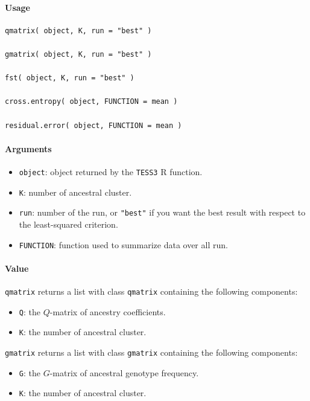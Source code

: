 \documentclass[10pt,a4paper]{article}
\begin{document}
\begin{itemize}
\paragraph{Usage}
\begin{Verbatim}
qmatrix( object, K, run = "best" )
 
gmatrix( object, K, run = "best" )
  
fst( object, K, run = "best" )
  
cross.entropy( object, FUNCTION = mean ) 

residual.error( object, FUNCTION = mean )

\end{Verbatim}
\paragraph{Arguments}
\begin{itemize}
\item \verb|object|: object returned by the \verb|TESS3| R function.
\item \verb|K|: number of ancestral cluster.
\item \verb|run|: number of the run, or \verb|"best"| if you want the best result with respect to the least-squared criterion.
\item \verb|FUNCTION|: function used to summarize data over all run.

\end{itemize}

\paragraph{Value}
\verb|qmatrix| returns a list with class \verb|qmatrix| containing the following components: 

\begin{itemize}
\item \verb|Q|: the $Q$-matrix of ancestry coefficients.
\item \verb|K|: the number of ancestral cluster.
\end{itemize}

\verb|gmatrix| returns a list with class \verb|gmatrix| containing the following components: 

\begin{itemize}
\item \verb|G|: the $G$-matrix of ancestral genotype frequency.
\item \verb|K|: the number of ancestral cluster.
\end{itemize}


\end{itemize}
\end{document}

